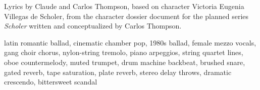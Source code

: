 
\begin{notes}
Lyrics by Claude and Carlos Thompson, based on character Victoria Eugenia Villegas de Scholer, %
from the character dossier document for the planned series \emph{Scholer} %
written and conceptualized by Carlos Thompson.
\end{notes}
\begin{style}
latin romantic ballad, cinematic chamber pop, 1980s ballad, female mezzo vocals, gang choir chorus, nylon-string tremolo, piano arpeggios, string quartet lines, oboe countermelody, muted trumpet, drum machine backbeat, brushed snare, gated reverb, tape saturation, plate reverb, stereo delay throws, dramatic crescendo, bittersweet scandal
\end{style}
